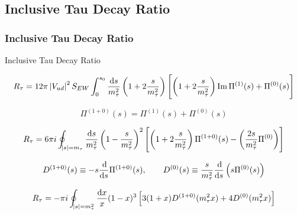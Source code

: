 \documentclass[fleqn]{beamer}
\DeclareMathOperator{\Ima}{Im}
\begin{document}
\subsection{Inclusive Tau Decay Ratio}
\begin{frame}
  \frametitle{Inclusive Tau Decay Ratio}
  \begin{block}{Inclusive Tau Decay Ratio}
    \begin{footnotesize}
      \begin{ceqn}
        \begin{equation}
          R_{\tau} = 12 \pi \,\abs{V_{ud}}^2 S_{EW} \int_0^{s_0} \frac{\dif s}{m_\tau^2} \left( 1 + 2 \frac{s}{m_\tau^2} \right)
          \left[ \left( 1+2\frac{s}{m_\tau^2} \right) \Ima \Pi^{(1)}(s) + \Pi^{(0)}(s)\right]
        \end{equation}
      \end{ceqn}
    \end{footnotesize}
  \end{block}
  \begin{small}
    \begin{ceqn}
      \begin{equation}
        \Pi^{(1+0)}(s) = \Pi^{(1)}(s) + \Pi^{(0)}(s)
      \end{equation}
    \end{ceqn}
    \begin{ceqn}
      \begin{equation}
        R_\tau = 6 \pi i \oint_{\abs{s}=m_\tau} \frac{\dif s}{m_\tau^2} \left( 1-\frac{s}{m_\tau^2} \right)^2
        \left[ \left( 1 + 2 \frac{s}{m_\tau^2} \right) \Pi^{(1+0)}(s) - \left( \frac{2s}{m_\tau^2}\Pi^{(0)} \right)\right]
      \end{equation}
    \end{ceqn}
    \begin{ceqn}
      \begin{equation}
        D^{(1+0)}(s) \equiv -s \frac{\dif}{\dif s} \Pi^{(1+0)}(s), \qquad D^{(0)}(s) \equiv \frac{s}{m_\tau^2} \frac{\dif}{\dif s} \left( s \Pi^{(0)}(s) \right)
      \end{equation}
    \end{ceqn}
    \begin{ceqn}
      \begin{equation}
        R_\tau = - \pi i \oint_{\abs{s}=m_\tau^2} \frac{\dif x}{x}(1-x)^3 \left[ 3(1+x)D^{(1+0)}(m_\tau^2x) + 4 D^{(0)}(m_\tau^2 x) \right]
      \end{equation}
    \end{ceqn}
  \end{small}
\end{frame}
\end{document}
